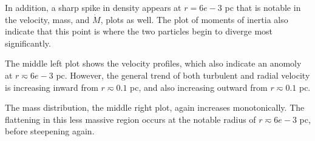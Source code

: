 \documentclass{emulateapj}
\begin{document}
In addition, a sharp spike in density appears at $r = 6e-3$ pc that is notable in the velocity, mass, and $\dot M$, plots as well.  The plot of moments of inertia also indicate that this point is where the two particles begin to diverge most significantly. 

The middle left plot shows the velocity profiles, which also indicate an anomoly at $r \eqsim 6e-3$ pc.  However, the general trend of both turbulent and radial velocity is increasing inward from $r \eqsim 0.1$ pc, and also increasing outward from $r \eqsim 0.1$ pc.

The mass distribution, the middle right plot, again increases monotonically.  The flattening in this less massive region occurs at the notable radius of $r \eqsim 6e-3$ pc, before steepening again.           


\end{document}
